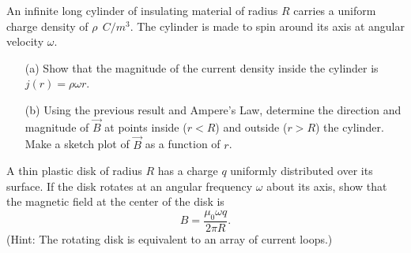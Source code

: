 \documentclass[12pt,letterpaper,boxed,cm]{hmcpset}
\newcommand{\f}[2]{\frac{#1}{#2}}
\begin{document}
\begin{problem}[SUP19]	
	An infinite long cylinder of insulating material of radius $R$ carries a uniform charge density of $\rho~\SI{}{C/m^3}$. The cylinder is made to spin around its axis at angular velocity $\omega$.
	\begin{enumerate}
		\item[(a)] Show that the magnitude of the current density inside the cylinder is $j(r) = \rho \omega r$.
		\item[(b)] Using the previous result and Ampere's Law, determine the direction and magnitude of $\vec{B}$ at points inside ($r < R$) and outside ($r > R$) the cylinder. Make a sketch plot of $\vec{B}$ as a function of $r$. 
	\end{enumerate}
\end{problem}
\begin{solution}
\end{solution}
\newpage

\begin{problem}[33-P8*]	
	A thin plastic disk of radius $R$ has a charge $q$ uniformly distributed over its surface. If the disk rotates at an angular frequency $\omega$ about its axis, show that the magnetic field at the center of the disk is
	\[
		B = \f{\mu_0\omega q}{2\pi R}.
	\]
	(Hint: The rotating disk is equivalent to an array of current loops.)
\end{problem}
\begin{solution}
\end{solution}
\end{document}
